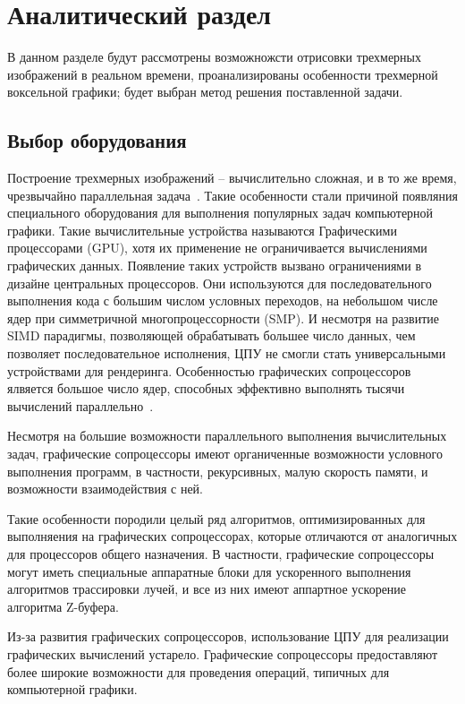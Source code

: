 \chapter{Аналитический раздел}

В данном разделе будут рассмотрены возможножсти отрисовки 
трехмерных изображений в реальном времени, проанализированы особенности трехмерной 
воксельной графики; будет выбран метод решения поставленной задачи.

\section{Выбор оборудования}

Построение трехмерных изображений -- вычислительно сложная, и в то же время, чрезвычайно 
параллельная задача~\cite{DaBPP}. Такие особенности стали причиной появляния специального оборудования 
для выполнения популярных задач компьютерной графики. Такие вычислительные устройства
называются Графическими процессорами (GPU), хотя их применение не ограничивается вычислениями
графических данных. Появление таких устройств вызвано ограничениями в дизайне центральных
процессоров. Они используются для последовательного выполнения кода с большим числом условных 
переходов, на небольшом числе ядер при симметричной многопроцессорности (SMP). И несмотря на 
развитие SIMD парадигмы, позволяющей обрабатывать большее число данных, чем позволяет
последовательное исполнения, ЦПУ не смогли стать универсальными устройствами для рендеринга.
Особенностью графических сопроцессоров ялвяется большое число ядер, способных эффективно 
выполнять тысячи вычислений параллельно~\cite{ACLaG}.

Несмотря на большие возможности параллельного выполнения вычислительных задач,
графические сопроцессоры имеют органиченные возможности условного выполнения программ, в 
частности, рекурсивных, малую скорость памяти, и возможности взаимодействия с ней.

Такие особенности породили целый ряд алгоритмов, оптимизированных для выполняения на графических
сопроцессорах, которые отличаются от аналогичных для процессоров общего назначения. В частности, 
графические сопроцессоры могут иметь специальные аппаратные блоки для ускоренного выполнения 
алгоритмов трассировки лучей, и все из них имеют аппартное ускорение алгоритма Z-буфера. ~\cite{RTiv}

Из-за развития графических сопроцессоров, использование ЦПУ для реализации графических
вычислений устарело. Графические сопроцессоры предоставляют более широкие возможности 
для проведения операций, типичных для компьютерной графики. 

